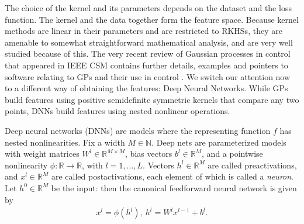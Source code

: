 \documentclass[letterpaper,12pt,peerreviewca,draftcls]{IEEEtran}
\newcommand{\R}{\mathbb{R}}
\newcommand{\ncent}{M}
\begin{document}
The choice of the kernel and its parameters
depends on the dataset and the loss function. The kernel and the data together form the feature space. Because kernel methods are linear
in their parameters and are restricted to RKHSs, they are amenable to somewhat straightforward mathematical analysis, and are very well
studied because of this. The very recent review of Gaussian processes in control that appeared in IEEE CSM contains further details, examples and pointers to software relating to GPs and their use in control \cite{Liu2018csmtutorial}. We switch our attention now to a different way of obtaining the features: Deep Neural Networks. While GPs build features using positive semidefinite symmetric kernels that compare any two points, DNNs build features using nested nonlinear operations. %

Deep neural networks (DNNs) are models where the representing function $f$ has nested nonlinearities. Fix a width $\ncent\in\mathbb{N}$. Deep nets are
parameterized models with 
weight matrices $W^l\in\R^{\ncent\times\ncent}$, bias vectors $b^l\in\R^{\ncent}$, and a pointwise nonlinearity $\phi:\R\to\R$, 
with $l=1,\dots,L$. Vectors $h^l\in\R^{\ncent}$ are called preactivations, and $x^l\in\R^{\ncent}$ are called postactivations,
each element of which is called a \emph{neuron}. 
Let $h^0\in\R^{\ncent}$ be the input: then the canonical feedforward neural network is given by 
\begin{align*}
 x^l = \phi(h^l), \ h^l = W^lx^{l-1} + b^l.
\end{align*}
\end{document}
